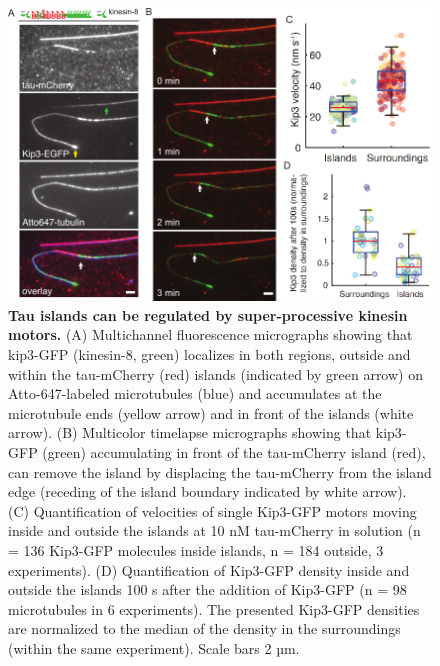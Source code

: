\begin{figure}[h!]
\centering
\includegraphics[scale=0.63]{Figures/tau4.png}
\caption[Tau islands can be regulated by super-processive kinesin motors.]{
\textbf{Tau islands can be regulated by super-processive kinesin motors.} (A) Multichannel fluorescence micrographs showing that kip3-GFP (kinesin-8, green) localizes in both regions, outside and within the tau-mCherry (red) islands (indicated by green arrow) on Atto-647-labeled microtubules (blue) and accumulates at the microtubule ends (yellow arrow) and in front of the islands (white arrow). (B) Multicolor timelapse micrographs showing that kip3-GFP (green) accumulating in front of the tau-mCherry island (red), can remove the island by displacing the tau-mCherry from the island edge (receding of the island boundary indicated by white arrow). (C) Quantification of velocities of single Kip3-GFP motors moving inside and outside the islands at 10 nM tau-mCherry in solution (n = 136 Kip3-GFP molecules inside islands, n = 184 outside, 3 experiments). (D) Quantification of Kip3-GFP density inside and outside the islands 100 s after the addition of Kip3-GFP (n = 98 microtubules in 6 experiments). The presented Kip3-GFP densities are normalized to the median of the density in the surroundings (within the same experiment).  Scale bars 2 µm.  
	}\label{tau4}
\end{figure}

